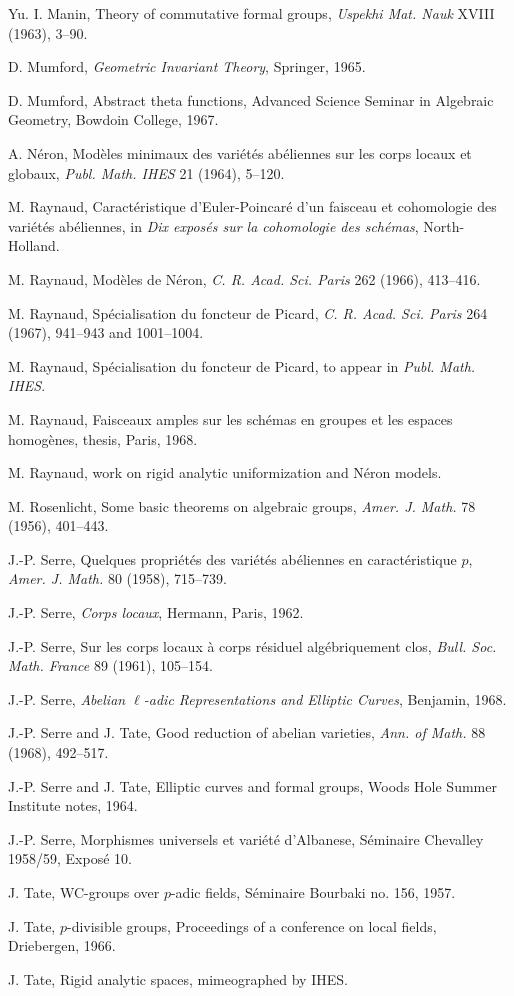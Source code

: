 \documentclass[12pt]{article}
\begin{document}
\begin{enumerate}[label={[\arabic*]},leftmargin=2.5em]
\item Yu. I. Manin, Theory of commutative formal groups, \emph{Uspekhi Mat. Nauk} XVIII (1963), 3--90.
\item D. Mumford, \emph{Geometric Invariant Theory}, Springer, 1965.
\item D. Mumford, Abstract theta functions, Advanced Science Seminar in Algebraic Geometry, Bowdoin College, 1967.
\item A. N\'eron, Mod\`eles minimaux des vari\'et\'es ab\'eliennes sur les corps locaux et globaux, \emph{Publ. Math. IHES} 21 (1964), 5--120.
\item M. Raynaud, Caract\'eristique d'Euler-Poincar\'e d'un faisceau et cohomologie des vari\'et\'es ab\'eliennes, in \emph{Dix expos\'es sur la cohomologie des sch\'emas}, North-Holland.
\item M. Raynaud, Mod\`eles de N\'eron, \emph{C. R. Acad. Sci. Paris} 262 (1966), 413--416.
\item M. Raynaud, Sp\'ecialisation du foncteur de Picard, \emph{C. R. Acad. Sci. Paris} 264 (1967), 941--943 and 1001--1004.
\item M. Raynaud, Sp\'ecialisation du foncteur de Picard, to appear in \emph{Publ. Math. IHES}.
\item M. Raynaud, Faisceaux amples sur les sch\'emas en groupes et les espaces homog\`enes, thesis, Paris, 1968.
\item M. Raynaud, work on rigid analytic uniformization and N\'eron models.
\item M. Rosenlicht, Some basic theorems on algebraic groups, \emph{Amer. J. Math.} 78 (1956), 401--443.
\item J.-P. Serre, Quelques propri\'et\'es des vari\'et\'es ab\'eliennes en caract\'eristique $p$, \emph{Amer. J. Math.} 80 (1958), 715--739.
\item J.-P. Serre, \emph{Corps locaux}, Hermann, Paris, 1962.
\item J.-P. Serre, Sur les corps locaux \`a corps r\'esiduel alg\'ebriquement clos, \emph{Bull. Soc. Math. France} 89 (1961), 105--154.
\item J.-P. Serre, \emph{Abelian $\ell$-adic Representations and Elliptic Curves}, Benjamin, 1968.
\item J.-P. Serre and J. Tate, Good reduction of abelian varieties, \emph{Ann. of Math.} 88 (1968), 492--517.
\item J.-P. Serre and J. Tate, Elliptic curves and formal groups, Woods Hole Summer Institute notes, 1964.
\item J.-P. Serre, Morphismes universels et vari\'et\'e d'Albanese, S\'eminaire Chevalley 1958/59, Expos\'e 10.
\item J. Tate, WC-groups over $p$-adic fields, S\'eminaire Bourbaki no. 156, 1957.
\item J. Tate, $p$-divisible groups, Proceedings of a conference on local fields, Driebergen, 1966.
\item J. Tate, Rigid analytic spaces, mimeographed by IHES.
\end{enumerate}
\end{document}
